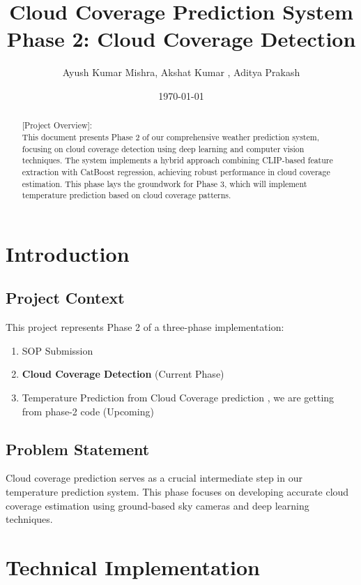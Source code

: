 \documentclass[11pt,a4paper]{article}
\title{
    \textcolor{primaryblue}{\textbf{\LARGE Cloud Coverage Prediction System}}\\
    \vspace{0.5cm}
    \Large Phase 2: Cloud Coverage Detection
}
\author{Ayush Kumar Mishra, Akshat Kumar , Aditya Prakash}
\date{\today}
\begin{document}
\maketitle

\begin{abstract}
[Project Overview]:\\

This document presents Phase 2 of our comprehensive weather prediction system, focusing on cloud coverage detection using deep learning and computer vision techniques. The system implements a hybrid approach combining CLIP-based feature extraction with CatBoost regression, achieving robust performance in cloud coverage estimation. This phase lays the groundwork for Phase 3, which will implement temperature prediction based on cloud coverage patterns.

\end{abstract}

\tableofcontents
\newpage

\section{Introduction}
\subsection{Project Context}
This project represents Phase 2 of a three-phase implementation:
\begin{enumerate}[label=\textcolor{primaryblue}{Phase \arabic*:}]
    \item SOP Submission
    \item \textbf{Cloud Coverage Detection} (Current Phase)
    \item Temperature Prediction from Cloud Coverage prediction , we are getting from phase-2 code (Upcoming)
\end{enumerate}

\subsection{Problem Statement}
Cloud coverage prediction serves as a crucial intermediate step in our temperature prediction system. This phase focuses on developing accurate cloud coverage estimation using ground-based sky cameras and deep learning techniques.


\section{Technical Implementation}
\end{document}
